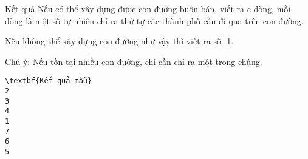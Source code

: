 Kết quả
Nếu có thể xây dựng được con đường buôn bán, viết ra c dòng, mỗi dòng là một số tự nhiên chỉ ra thứ tự các thành phố cần đi qua trên con đường.  

   Nếu không thể xây dựng con đường như vậy thì viết ra số -1.  

   Chú ý: Nếu tồn tại nhiều con đường, chỉ cần chỉ ra một trong chúng.  
\begin{verbatim}
\textbf{Kết quả mẫu}
2
3
4
1
7
6
5
\end{verbatim}